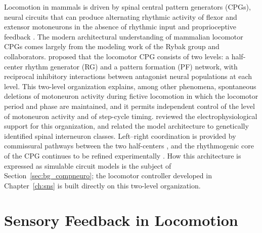 Locomotion in mammals is driven by spinal central pattern generators (CPGs), neural circuits that can produce alternating rhythmic activity of flexor and extensor motoneurons in the absence of rhythmic input and proprioceptive feedback \citep{brown_intrinsic_1911, rybak_modelling_2006}. The modern architectural understanding of mammalian locomotor CPGs comes largely from the modeling work of the Rybak group and collaborators. \citet{rybak_modelling_2006} proposed that the locomotor CPG consists of two levels: a half-center rhythm generator (RG) and a pattern formation (PF) network, with reciprocal inhibitory interactions between antagonist neural populations at each level. This two-level organization explains, among other phenomena, spontaneous deletions of motoneuron activity during fictive locomotion in which the locomotor period and phase are maintained, and it permits independent control of the level of motoneuron activity and of step-cycle timing. \citet{mccrea_organization_2008} reviewed the electrophysiological support for this organization, and \citet{rybak_organization_2015} related the model architecture to genetically identified spinal interneuron classes. Left--right coordination is provided by commissural pathways between the two half-centers \citep{molkov_mechanisms_2015, danner_central_2016}, and the rhythmogenic core of the CPG continues to be refined experimentally \citep{rancic_recent_2021}. How this architecture is expressed as simulable circuit models is the subject of Section~\ref{sec:bg_compneuro}; the locomotor controller developed in Chapter~\ref{ch:sns} is built directly on this two-level organization.


\section{Sensory Feedback in Locomotion}\label{sec:bg_sensory}

